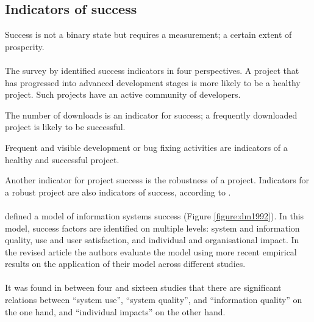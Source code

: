 \subsection{Indicators of success}
Success is not a binary state but requires a measurement; a certain extent of
prosperity.

\paragraph{}
The survey by \citet{androutsellis} identified success indicators in four
perspectives. A project that has progressed into advanced development stages is
more likely to be a healthy project. Such projects have an active community of
developers.

The number of downloads is an indicator for success; a frequently downloaded
project is likely to be successful.

Frequent and visible development or bug fixing activities are indicators of a
healthy and successful project.

Another indicator for project success is the robustness of a project. Indicators
for a robust project are also indicators of success, according to
\citet{androutsellis}.

\paragraph{}
\citet{delone1992} defined a model of information systems success (Figure
\ref{figure:dm1992}). In this model, success factors are identified on multiple
levels: system and information quality, use and user satisfaction, and
individual and organisational impact. In the revised article \cite{delone2003}
the authors evaluate the model using more recent empirical results on the
application of their model across different studies.



\paragraph{}
It was found in between four and sixteen studies that there are significant
relations between ``system use'', ``system quality'', and ``information
quality'' on the one hand, and ``individual impacts'' on the other hand.

